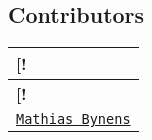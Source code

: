 \subsection*{Contributors}

\tabulinesep=1mm
\begin{longtabu} spread 0pt [c]{*{1}{|X[-1]}|}
\hline
\rowcolor{\tableheadbgcolor}\textbf{ \mbox{[}!   }\\
\endfirsthead
\hline
\endfoot
\hline
\rowcolor{\tableheadbgcolor}\textbf{ \mbox{[}!   }\\
\endhead
\href{http://mathiasbynens.be/}{\tt Mathias Bynens}   \\
\end{longtabu}
